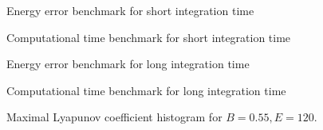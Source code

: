 \documentclass{beamer}
\begin{document}

\begin{frame}
\end{frame}


\begin{frame}
	\begin{figure}
		
		\caption{Energy error benchmark for short integration time}
	\end{figure}
\end{frame}


\begin{frame}
	\begin{figure}
		
		\caption{Computational time benchmark for short integration time}
	\end{figure}
\end{frame}


\begin{frame}
	\begin{figure}
		
		\caption{Energy error benchmark for long integration time}
	\end{figure}
\end{frame}


\begin{frame}
	\begin{figure}
		
		\caption{Computational time benchmark for long integration time}
	\end{figure}
\end{frame}


\begin{frame}
	\begin{figure}
		
		\caption{Maximal Lyapunov coefficient histogram for \(B=0.55, E=120\).}
	\end{figure}
\end{frame}
\end{document}
